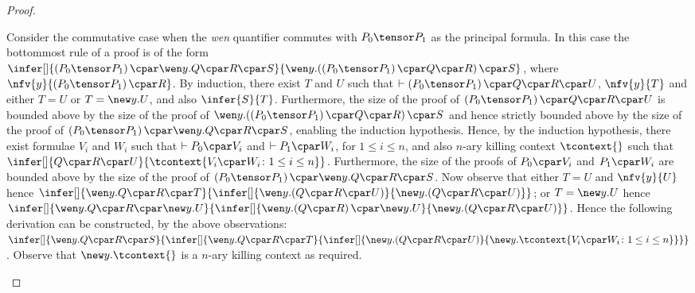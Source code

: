 \documentclass[UKenglish,acmsmall,authorversion]{acmart}
\theoremstyle{plain}
\begin{document}
{\begin{proof}
\begin{enumerate}[label=\textbf{\Alph*},ref=\Alph*,leftmargin=*]
{Consider the commutative case when the \textit{wen} quantifier commutes with $P_0 \tensor P_1$ as the principal formula.
In this case the bottommost rule of a proof is of the form $
\infer[]{
\left( P_0 \tensor P_1 \right) \cpar \wen y. Q \cpar R \cpar S
}{
 \mathopen{\wen y.} \left( \left( P_0 \tensor P_1 \right) \cpar Q \cpar R\right) \cpar S
}$, where $\nfv{y}{\left( P_0 \tensor P_1 \right) \cpar R}$.
By induction, there exist $T$ and $U$ such that $\vdash \left( P_0 \tensor P_1 \right) \cpar Q \cpar R \cpar U$, $\nfv{y}{T}$ and either $T = U$ or $T = \new y. U$, and also
$\infer{S}{T}$.
%
Furthermore, the size of the proof of $\left( P_0 \tensor P_1 \right) \cpar Q \cpar R \cpar U$ is bounded above by the size of the proof of $\mathopen{\wen y.} \left( \left( P_0 \tensor P_1 \right) \cpar Q \cpar R\right) \cpar S$ and hence strictly bounded above by the size of the proof of $\left( P_0 \tensor P_1 \right) \cpar \wen y. Q \cpar R \cpar S$, enabling the induction hypothesis.
Hence, by the induction hypothesis, there exist formulae $V_i$ and $W_i$ such that $\vdash P_0 \cpar V_i$ and $\vdash P_1 \cpar W_i$, for $1 \leq i \leq n$, and also $n$-ary killing context $\tcontext{}$ such that
$\infer[]{
Q \cpar R \cpar U
}{
\tcontext{ V_i \cpar W_i \colon 1 \leq i \leq n }
}$.
Furthermore, the size of the proofs of $P_0 \cpar V_i$ and $P_1 \cpar W_i$ are bounded above by the size of the proof of $\left( P_0 \tensor P_1 \right) \cpar \wen y. Q \cpar R \cpar S$.
%
Now observe that either $T = U$ and $\nfv{y}{U}$ hence
$\infer[]{
\wen y. Q \cpar R \cpar T
}{
\infer[]{
\mathopen{\wen y.} \left(Q \cpar R \cpar U\right)
}{
 \mathopen{\new y.} \left(Q \cpar R \cpar U\right)
}}$;
or $T = \new y. U$ hence $
\infer[]{
\wen y. Q \cpar R \cpar \new y. U
}{
\infer[]{
\mathopen{\wen y.} \left(Q \cpar R\right) \cpar \new y. U
}{
 \mathopen{\new y.} \left(Q \cpar R \cpar U\right)
}}$.
Hence the following derivation can be constructed, by the above observations:
$
\infer[]{
\wen y. Q \cpar R \cpar S
}{
\infer[]{
\wen y. Q \cpar R \cpar T
}{
\infer[]{
\mathopen{\new y.} \left( Q \cpar R \cpar U \right)
}{
\mathopen{\new y.} \tcontext{ V_i \cpar W_i \colon 1 \leq i \leq n }
}}}
$.
Observe that $\new y. \tcontext{ }$ is a $n$-ary killing context as required.
\smallskip



}
\end{enumerate}
\end{proof}}
\end{document}
